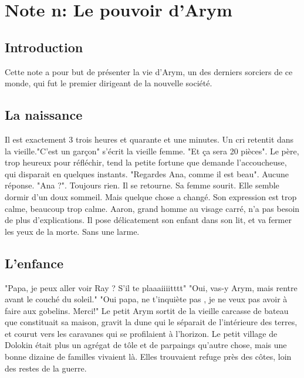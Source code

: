 \section{Note n: Le pouvoir d'Arym}
\subsection{Introduction}
Cette note a pour but de présenter la vie d'Arym, un des derniers sorciers de ce monde, qui fut le premier dirigeant de la nouvelle société.
\subsection{La naissance}
Il est exactement 3 trois heures et quarante et une minutes. Un cri retentit dans la vieille."C'est un garçon" s'écrit la vieille femme. "Et ça sera 20 pièces". Le père, trop heureux pour réfléchir, tend la petite fortune que demande l'accoucheuse, qui disparait en quelques instants.
\newline
"Regardes Ana, comme il est beau". Aucune réponse. "Ana ?". Toujours rien. Il se retourne. Sa femme sourit. Elle semble dormir d'un doux sommeil. Mais quelque chose a changé. Son expression est trop calme, beaucoup trop calme. Aaron, grand homme au visage carré, n'a pas besoin de plus d'explications. Il pose délicatement son enfant dans son lit, et va fermer les yeux de la morte. Sans une larme.
\subsection{L'enfance}
"Papa, je peux aller voir Ray ? S'il te plaaaiiiitttt"
\newline
"Oui, vas-y Arym, mais rentre avant le couché du soleil."
\newline
"Oui papa, ne t'inquiète pas , je ne veux pas avoir à faire aux gobelins. Merci!"
\newline
Le petit Arym sortit de la vieille carcasse de bateau que constituait sa maison, gravit la dune qui le séparait de l'intérieure des terres, et courut vers les caravanes qui se profilaient à l'horizon. Le petit village de Dolokin était plus un agrégat de tôle et de parpaings qu'autre chose, mais une bonne dizaine de familles vivaient là. Elles trouvaient refuge près des côtes, loin des restes de la guerre.